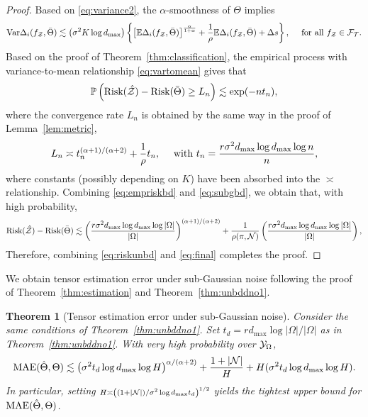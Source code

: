 \documentclass[11pt]{article}
\theoremstyle{plain}
\newtheorem{thm}{Theorem}[section]
\theoremstyle{definition}
\begin{document}
\begin{proof}
Based on \eqref{eq:variance2}, the $\alpha$-smoothness of $\Theta$ implies
\begin{align}\label{eq:vartomean}
\text{Var}\Delta_i(f_{\mathcal{Z}},\bar \Theta)\lesssim \left(\sigma^2K\log d_{\max}\right) \left\{\left[\mathbb{E}\Delta_i(f_{\mathcal{Z}},\bar \Theta)\right]^{\alpha\over1+\alpha}+\frac{1}{\rho}\mathbb{E}\Delta_i(f_{\mathcal{Z}},\bar \Theta)+\Delta s\right\},\quad\text{ for all } f_{\mathcal{Z}}\in\mathcal{F}_{\mathcal{T}}.
\end{align}
Based on the proof of Theorem~\ref{thm:classification}, the empirical process with variance-to-mean relationship  \eqref{eq:vartomean} gives that
\begin{align}\label{eq:empriskbd}
\mathbb{P	}\left(\text{Risk}(\hat{\mathcal{Z}})-\text{Risk}(\bar\Theta)\geq L_n\right)\lesssim \exp(-nt_n),
\end{align}
where the convergence rate $L_n$ is obtained by the same way in the proof of Lemma~\ref{lem:metric}, 
\begin{align}\label{eq:subgbd}
L_n\asymp t_n^{(\alpha+1)/(\alpha+2)}+\frac{1}{\rho}t_n,\quad\text{ with } t_n =  {r \sigma^2 d_{\max}\log d_{\max}\log n  \over n},
\end{align}
where constants (possibly depending on $K$) have been absorbed into the $\asymp$ relationship.
Combining \eqref{eq:empriskbd} and \eqref{eq:subgbd}, we obtain that, with high probability, 
\begin{align}\label{eq:riskunbd}
   \text{Risk}(\hat{\mathcal{Z}})-\text{Risk}(\bar\Theta)\lesssim \left( {r \sigma^2  d_{\max}\log d_{\max}\log|\Omega|  \over |\Omega|}\right)^{(\alpha+1)/(\alpha+2)}+\frac{1}{\rho(\pi,\mathcal{N})} \left({r \sigma^2  d_{\max} \log d_{\max}\log|\Omega| \over |\Omega|} \right),
\end{align} 
 Therefore, combining \eqref{eq:riskunbd} and \eqref{eq:final} completes the proof.
\end{proof}

We obtain tensor estimation error under sub-Gaussian noise following the proof of Theorem~\ref{thm:estimation} and Theorem~\ref{thm:unbddno1}.
\begin{thm}[Tensor estimation error under sub-Gaussian noise] Consider the same conditions of Theorem~\ref{thm:unbddno1}. Set $t_d = {r d_{\max}\log|\Omega|/|\Omega|}$ as in Theorem~\ref{thm:unbddno1}. With very high probability over $\mathcal{Y}_\Omega$,
\begin{equation}\label{eq:bound2}
\textup{MAE}(\hat \Theta, \Theta)\lesssim \left(\sigma^2t_d\log d_{\max}\log H\right)^{\alpha/(\alpha+2)}+{1+|\mathcal{N}|\over H}+{H( \sigma^2t_d \log d_{\max}\log H)}.
\end{equation}
In particular, setting $\scriptstyle H\asymp \left( (1+|\mathcal{N}|)/ \sigma^2\log d_{\max} t_d \right)^{1/2}$ yields the tightest upper bound for $\textup{MAE}(\hat\Theta,\Theta)$.
\end{thm}
\end{document}
